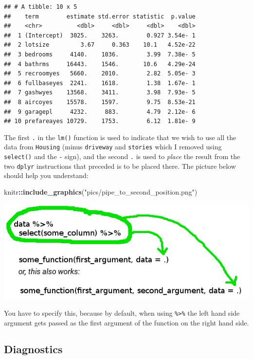 \documentclass[]{gitbook}
\newenvironment{Shaded}{\begin{snugshade}}{\end{snugshade}}
\newcommand{\KeywordTok}[1]{\textcolor[rgb]{0.13,0.29,0.53}{\textbf{#1}}}
\newcommand{\NormalTok}[1]{#1}
\newcommand{\OperatorTok}[1]{\textcolor[rgb]{0.81,0.36,0.00}{\textbf{#1}}}
\newcommand{\StringTok}[1]{\textcolor[rgb]{0.31,0.60,0.02}{#1}}
\begin{document}
\begin{verbatim}
## # A tibble: 10 x 5
##    term        estimate std.error statistic  p.value
##    <chr>          <dbl>     <dbl>     <dbl>    <dbl>
##  1 (Intercept)  3025.    3263.        0.927 3.54e- 1
##  2 lotsize         3.67     0.363    10.1   4.52e-22
##  3 bedrooms     4140.    1036.        3.99  7.38e- 5
##  4 bathrms     16443.    1546.       10.6   4.29e-24
##  5 recroomyes   5660.    2010.        2.82  5.05e- 3
##  6 fullbaseyes  2241.    1618.        1.38  1.67e- 1
##  7 gashwyes    13568.    3411.        3.98  7.93e- 5
##  8 aircoyes    15578.    1597.        9.75  8.53e-21
##  9 garagepl     4232.     883.        4.79  2.12e- 6
## 10 prefareayes 10729.    1753.        6.12  1.81e- 9
\end{verbatim}

The first \texttt{.} in the \texttt{lm()} function is used to indicate that we wish to use all the data from \texttt{Housing}
(minus \texttt{driveway} and \texttt{stories} which I removed using \texttt{select()} and the \texttt{-} sign), and the second \texttt{.} is
used to \emph{place} the result from the two \texttt{dplyr} instructions that preceded is to be placed there.
The picture below should help you understand:

\begin{Shaded}
\begin{Highlighting}[]
\NormalTok{knitr}\OperatorTok{::}\KeywordTok{include_graphics}\NormalTok{(}\StringTok{"pics/pipe_to_second_position.png"}\NormalTok{)}
\end{Highlighting}
\end{Shaded}

\includegraphics[width=8in]{pics/pipe_to_second_position}

You have to specify this, because by default, when using \texttt{\%\textgreater{}\%} the left hand side argument gets
passed as the first argument of the function on the right hand side.

\hypertarget{diagnostics}{%
\subsection{Diagnostics}\label{diagnostics}}
\end{document}
